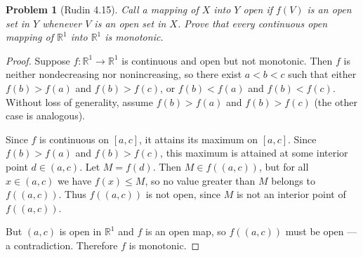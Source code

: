 \documentclass[12 pt]{article}        	%
\newtheorem{prob}{Problem}
\newcommand{\R}{\mathbb{R}}
\begin{document}
\begin{prob}[Rudin 4.15]
Call a mapping of $X$ into $Y$ \emph{open} if $f(V)$ is an open set in $Y$ whenever $V$ is an open set in $X$. Prove that every continuous open mapping of $\R^1$ into $\R^1$ is monotonic.
\end{prob}
\begin{proof}
Suppose $f: \R^1 \to \R^1$ is continuous and open but not monotonic. Then $f$ is neither nondecreasing nor nonincreasing, so there exist $a < b < c$ such that either $f(b) > f(a)$ and $f(b) > f(c)$, or $f(b) < f(a)$ and $f(b) < f(c)$. Without loss of generality, assume $f(b) > f(a)$ and $f(b) > f(c)$ (the other case is analogous).

Since $f$ is continuous on $[a,c]$, it attains its maximum on $[a,c]$. Since $f(b) > f(a)$ and $f(b) > f(c)$, this maximum is attained at some interior point $d \in (a,c)$. Let $M = f(d)$. Then $M \in f((a,c))$, but for all $x \in (a,c)$ we have $f(x) \leq M$, so no value greater than $M$ belongs to $f((a,c))$. Thus $f((a,c))$ is not open, since $M$ is not an interior point of $f((a,c))$.

But $(a,c)$ is open in $\R^1$ and $f$ is an open map, so $f((a,c))$ must be open --- a contradiction. Therefore $f$ is monotonic.
\end{proof}
\end{document}
